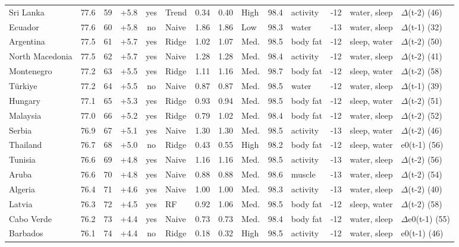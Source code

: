 {\begin{longtable}{l r r r c l r r l r l r l l}
Sri Lanka & 77.6 & 59 & +5.8 & yes & Trend & 0.34 & 0.40 & High & 98.4 & activity & -12 & water, sleep & $\Delta$(t-2) (46) \\
Ecuador & 77.6 & 60 & +5.8 & no & Naive & 1.86 & 1.86 & Low & 98.3 & water & -13 & water, sleep & $\Delta$(t-1) (32) \\
Argentina & 77.5 & 61 & +5.7 & yes & Ridge & 1.02 & 1.07 & Med. & 98.5 & body fat & -12 & sleep, water & $\Delta$(t-2) (50) \\
North Macedonia & 77.5 & 62 & +5.7 & yes & Naive & 1.28 & 1.28 & Med. & 98.4 & activity & -12 & water, sleep & $\Delta$(t-2) (41) \\
Montenegro & 77.2 & 63 & +5.5 & yes & Ridge & 1.11 & 1.16 & Med. & 98.7 & body fat & -12 & sleep, water & $\Delta$(t-2) (58) \\
Türkiye & 77.2 & 64 & +5.5 & no & Naive & 0.87 & 0.87 & Med. & 98.5 & water & -12 & water, sleep & $\Delta$(t-1) (39) \\
Hungary & 77.1 & 65 & +5.3 & yes & Ridge & 0.93 & 0.94 & Med. & 98.5 & body fat & -12 & sleep, water & $\Delta$(t-2) (51) \\
Malaysia & 77.0 & 66 & +5.2 & yes & Ridge & 0.79 & 1.02 & Med. & 98.4 & body fat & -12 & water, sleep & $\Delta$(t-2) (52) \\
Serbia & 76.9 & 67 & +5.1 & yes & Naive & 1.30 & 1.30 & Med. & 98.5 & activity & -13 & sleep, water & $\Delta$(t-2) (46) \\
Thailand & 76.7 & 68 & +5.0 & no & Ridge & 0.43 & 0.55 & High & 98.2 & body fat & -12 & sleep, water & e0(t-1) (56) \\
Tunisia & 76.6 & 69 & +4.8 & yes & Naive & 1.16 & 1.16 & Med. & 98.5 & activity & -13 & water, sleep & $\Delta$(t-2) (56) \\
Aruba & 76.6 & 70 & +4.8 & yes & Naive & 0.88 & 0.88 & Med. & 98.6 & muscle & -13 & water, sleep & $\Delta$(t-2) (54) \\
Algeria & 76.4 & 71 & +4.6 & yes & Naive & 1.00 & 1.00 & Med. & 98.3 & activity & -13 & water, sleep & $\Delta$(t-2) (40) \\
Latvia & 76.3 & 72 & +4.5 & yes & RF & 0.92 & 1.06 & Med. & 98.5 & body fat & -12 & sleep, water & $\Delta$(t-2) (58) \\
Cabo Verde & 76.2 & 73 & +4.4 & yes & Naive & 0.73 & 0.73 & Med. & 98.4 & body fat & -12 & water, sleep & $\Delta$e0(t-1) (55) \\
Barbados & 76.1 & 74 & +4.4 & no & Ridge & 0.18 & 0.32 & High & 98.5 & activity & -12 & water, sleep & e0(t-1) (46) \\

\end{longtable}}
